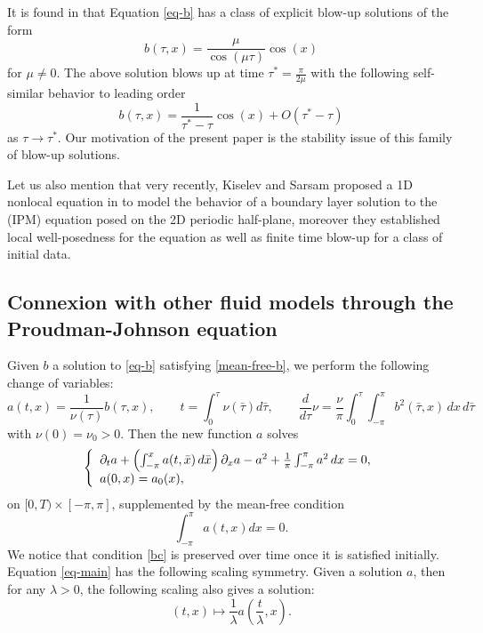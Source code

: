 \documentclass[12pt]{amsart}
\numberwithin{equation}{section}
\numberwithin{equation}{section}
\begin{document}
 It is found in \cite{CCGO} that Equation \eqref{eq-b} has a class of explicit blow-up solutions of the form
\begin{equation} \label{id:explicit-blow-up}
b(\tau,x)=\frac{\mu}{\cos (\mu \tau)} \cos(x)
\end{equation}
for $\mu \neq 0$. The above solution blows up at time $\tau^*=\frac{\pi}{2\mu}$ with the following self-similar behavior to leading order
\begin{equation} \label{id:explicit-blow-up-2}
b(\tau,x)=\frac{1}{\tau^*-\tau} \cos(x)+O(\tau^*-\tau)
\end{equation}
as $\tau \to \tau^*$. Our motivation  of the present paper is the stability issue of this family of  blow-up solutions. 


Let us also mention that very recently,    Kiselev and Sarsam proposed a 1D nonlocal equation in \cite{KS} to model the behavior of a boundary layer solution to the (IPM) equation posed on the 2D periodic half-plane,   moreover they established local well-posedness for the equation as well as finite time blow-up for a class of initial data.



\subsection{Connexion with other fluid models through the Proudman-Johnson equation} \label{other-fluids}

Given $b$ a solution to \eqref{eq-b} satisfying \eqref{mean-free-b}, we perform the following change of variables:
\begin{equation}\label{def-a}
a(t,x)=\frac{1}{\nu(\tau)}b(\tau,x), \qquad t=\int_0^\tau \nu(\bar \tau)d\bar \tau, \qquad \frac{d}{d\tau}\nu =\frac{\nu}{\pi}\int_0^{\tau} \int_{-\pi}^{\pi}b^2(\bar \tau,  x)\,dx\,d\bar\tau 
\end{equation}
with $\nu(0)=\nu_0>0$. Then the new function $a$ solves
\begin{equation}\label{eq-main}
\left\{ \begin{array}{l l }
\partial_t a+  \left(\int_{-\pi}^x a(t, \bar x) \,d\bar x\right) \partial_x a -a^2 +\frac{1}{\pi}  \int_{-\pi}^{\pi}a^
2\,dx=0, \\
a(0, x)=a_0(x), 
\end{array} \right.
\end{equation}
on $[0,T)\times [-\pi,\pi]$, supplemented by the mean-free condition
\begin{equation} \label{bc}
\int_{-\pi}^\pi a(t,x)dx=0.
\end{equation}
We notice that condition \eqref{bc} is preserved over time once it is satisfied initially. Equation \eqref{eq-main} has the following scaling symmetry. Given a solution $a$, then for any $\lambda>0$, the following scaling also gives a solution:
\begin{equation} \label{id:scaling-symmetry}
(t,x)\mapsto \frac{1}{\lambda}a\left(\frac{t}{\lambda},x \right).
\end{equation}
\end{document}
